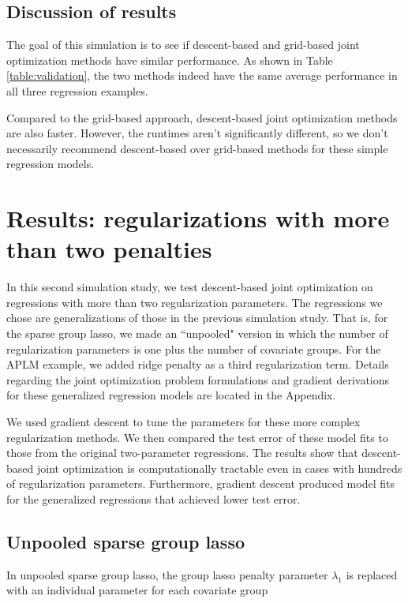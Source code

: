 \documentclass[10pt,letterpaper]{article}
\begin{document}
\subsection{Discussion of results}

The goal of this simulation is to see if descent-based and grid-based joint optimization methods have similar performance.
As shown in Table \ref{table:validation}, the two methods indeed have the same average performance in all three regression examples.

Compared to the grid-based approach, descent-based joint optimization methods are also faster. However, the runtimes aren't significantly different, so we don't necessarily recommend descent-based over grid-based methods for these simple regression models.

\section{Results: regularizations with more than two penalties}

In this second simulation study, we test descent-based joint optimization on regressions with more than two regularization parameters. The regressions we chose are generalizations of those in the previous simulation study. That is, for the sparse group lasso, we made an ``unpooled" version in which the number of regularization parameters is one plus the number of covariate groups. For the APLM example, we added ridge penalty as a third regularization term. Details regarding the joint optimization problem formulations and gradient derivations for these generalized regression models are located in the Appendix.

We used gradient descent to tune the parameters for these more complex regularization methods. We then compared the test error of these model fits to those from the original two-parameter regressions. The results show that descent-based joint optimization is computationally tractable even in cases with hundreds of regularization parameters. Furthermore, gradient descent produced model fits for the generalized regressions that achieved lower test error.

\subsection{Unpooled sparse group lasso}

In unpooled sparse group lasso, the group lasso penalty parameter $\lambda_1$ is replaced with an individual parameter for each covariate group
\end{document}

